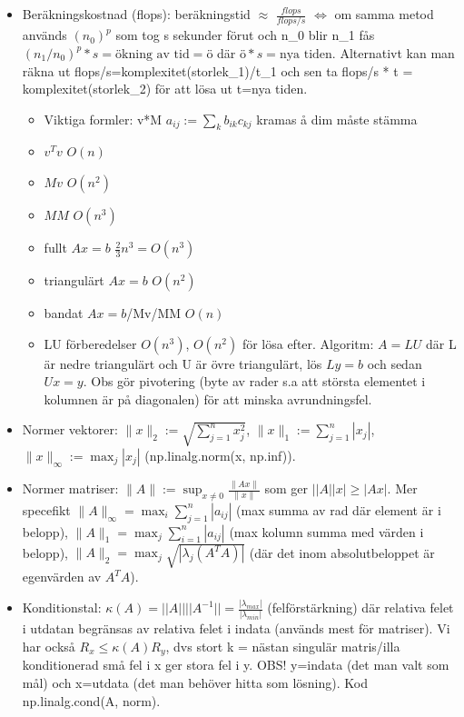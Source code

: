 \documentclass[a4paper]{article}
\begin{document}
\begin{itemize}
    \item Beräkningskostnad (flops): beräkningstid $\approx$ $\frac{flops}{flops/s}$ $\Longleftrightarrow$ om samma metod används $(n_0)^p$ som tog s sekunder förut och n_0 blir n_1 fås $(n_1/n_0)^p*s=\text{ökning av tid}=ö$ där $ö*s=\text{nya tiden}$. Alternativt kan man räkna ut flops/s=komplexitet(storlek_1)/t_1 och sen ta flops/s * t = komplexitet(storlek_2) för att lösa ut t=nya tiden. 
    \begin{itemize}
        \item Viktiga formler: v*M $a_{ij}:=\sum_k b_{ik}c_{kj}$ kramas å dim måste stämma
        \item $v^Tv$ $O(n)$
        \item $Mv$ $O(n^2)$
        \item $MM$ $O(n^3)$  
        \item fullt $Ax=b$ $\frac{2}{3}n^3=O(n^3)$
        \item triangulärt $Ax=b$ $O(n^2)$
        \item bandat $Ax=b$/Mv/MM $O(n)$
        \item LU förberedelser $O(n^3)$, $O(n^2)$ för lösa efter. Algoritm: $A=LU$ där L är nedre triangulärt och U är övre triangulärt, lös $Ly=b$ och sedan $Ux=y$. Obs gör pivotering (byte av rader s.a att största elementet i kolumnen är på diagonalen) för att minska avrundningsfel.
    \end{itemize}
    \item Normer vektorer: $\|x\|_2:=\sqrt{\sum_{j=1}^{n} x_j^2}$, $\|x\|_1:=\sum_{j=1}^{n} |x_j|$, $\|x\|_\infty:=\max_j|x_j|$ (np.linalg.norm(x, np.inf)).
    \item Normer matriser: $\|A\|:=\sup_{x\neq 0}\frac{\|Ax\|}{\|x\|}$ som ger $||A||x| \geq |Ax|$. Mer specefikt $\|A\|_\infty = \max_i \sum_{j=1}^{n} |a_{ij}|$ (max summa av rad där element är i belopp), $\|A\|_1 = \max_j \sum_{i=1}^{n} |a_{ij}|$ (max kolumn summa med värden i belopp), $\|A\|_2 = \max_j\sqrt{|\lambda_j(A^TA)|}$ (där det inom absolutbeloppet är egenvärden av $A^TA$).
    \item Konditionstal: $\kappa(A) = ||A|| ||A^{-1}|| = \frac{|\lambda_{max}|}{|\lambda_{min}|}$ (felförstärkning) där relativa felet i utdatan begränsas av relativa felet i indata (används mest för matriser). Vi har också $R_x\leq \kappa(A) R_y$, dvs stort k = nästan singulär matris/illa konditionerad små fel i x ger stora fel i y. OBS! y=indata (det man valt som mål) och x=utdata (det man behöver hitta som lösning). Kod np.linalg.cond(A, norm).

\end{itemize}
\end{document}
